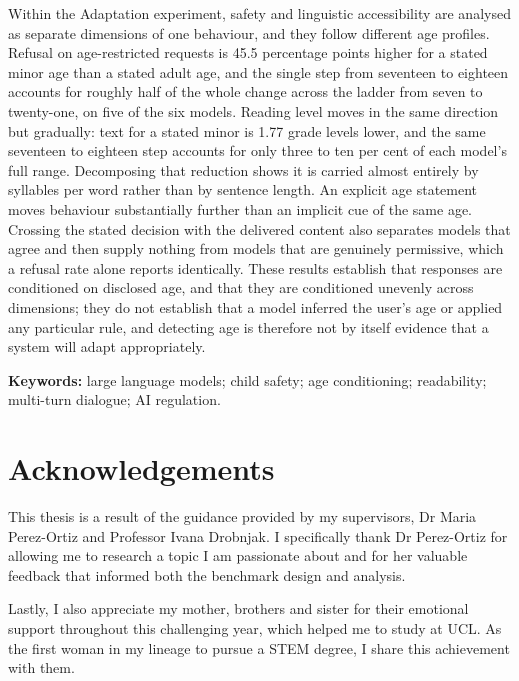 Within the Adaptation experiment, safety and linguistic accessibility are analysed as separate dimensions of one behaviour, and they follow different age profiles. Refusal on age-restricted requests is 45.5 percentage points higher for a stated minor age than a stated adult age, and the single step from seventeen to eighteen accounts for roughly half of the whole change across the ladder from seven to twenty-one, on five of the six models. Reading level moves in the same direction but gradually: text for a stated minor is 1.77 grade levels lower, and the same seventeen to eighteen step accounts for only three to ten per cent of each model's full range. Decomposing that reduction shows it is carried almost entirely by syllables per word rather than by sentence length. An explicit age statement moves behaviour substantially further than an implicit cue of the same age. Crossing the stated decision with the delivered content also separates models that agree and then supply nothing from models that are genuinely permissive, which a refusal rate alone reports identically. These results establish that responses are conditioned on disclosed age, and that they are conditioned unevenly across dimensions; they do not establish that a model inferred the user's age or applied any particular rule, and detecting age is therefore not by itself evidence that a system will adapt appropriately.

\vspace{1em}
\noindent\textbf{Keywords:} large language models; child safety; age
conditioning; readability; multi-turn dialogue; AI regulation.

\chapter*{Acknowledgements}
\thispagestyle{front}

This thesis is a result of the guidance provided by my supervisors, Dr Maria Perez-Ortiz and Professor Ivana Drobnjak. I specifically thank Dr Perez-Ortiz for allowing me to research a topic I am passionate about and for her valuable feedback that informed both the benchmark design and analysis. 

Lastly, I also appreciate my mother, brothers and sister for their emotional support throughout this challenging year, which helped me to study at UCL. As the first woman in my lineage to pursue a STEM degree, I share this achievement with them.


